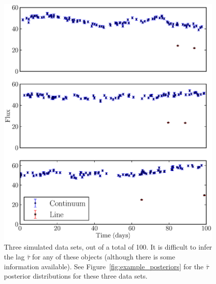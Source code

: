 \documentclass[useAMS,usenatbib]{mn2e}
\begin{document}
\begin{figure}
\begin{center}
\includegraphics[scale=0.5]{Figures/data.eps}
\caption{Three simulated data sets, out of a total of 100. It is difficult to
infer the lag $\bar{\tau}$ for any of these objects (although there is some
information available). See Figure~\ref{fig:example_posteriors} for the
$\bar{\tau}$ posterior distributions for these three data sets.
\label{fig:data}}
\end{center}
\end{figure}
\end{document}
